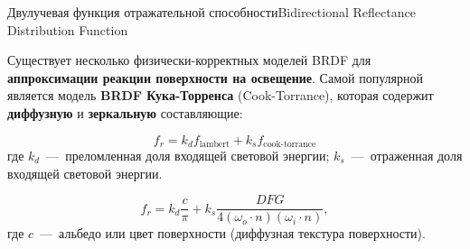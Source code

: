\documentclass{beamer}
\begin{document}
	\begin{frame}{Двулучевая функция отражательной способности}{Bidirectional Reflectance Distribution Function}

		Существует несколько физически-корректных моделей BRDF для \textbf{аппроксимации реакции поверхности на освещение}. 
		Самой популярной является модель \textbf{BRDF Кука-Торренса} 
		(Cook-Torrance), которая содержит \textbf{диффузную} и \textbf{зеркальную} составляющие:
		
		\[
			f_r =
			k_d f_{\text{lambert}}
			+
			k_s f_{\text{cook-torrance}} 	
		\]
		где 
		$k_d$~---~преломленная доля входящей световой энергии;
		$k_s$~---~отраженная доля входящей световой энергии.

		\[
			f_r =
			k_d \frac{c}{\pi} 
			+
			k_s \frac{DFG}{4 (\omega_o \cdot n) (\omega_i \cdot n)} 	
		,
			\]
		где 
		$c$~---~альбедо или цвет поверхности (диффузная текстура поверхности).

		
		
		
		\note{


			
		}
	\end{frame}
\end{document}
